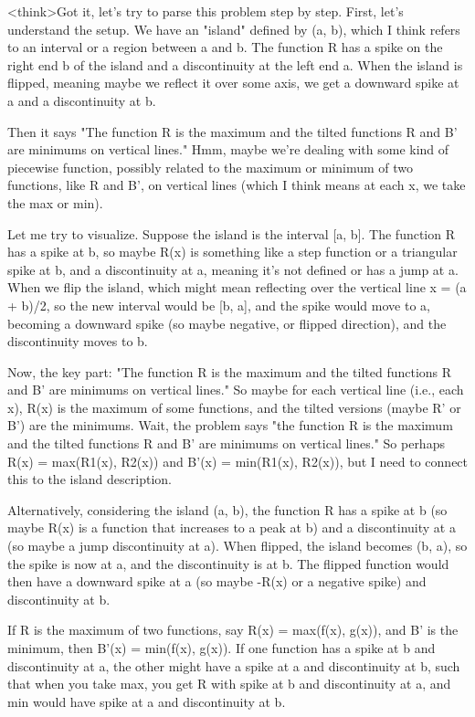 <think>Got it, let's try to parse this problem step by step. First, let's understand the setup. We have an "island" defined by (a, b), which I think refers to an interval or a region between a and b. The function R has a spike on the right end b of the island and a discontinuity at the left end a. When the island is flipped, meaning maybe we reflect it over some axis, we get a downward spike at a and a discontinuity at b. 

Then it says "The function R is the maximum and the tilted functions R and B' are minimums on vertical lines." Hmm, maybe we're dealing with some kind of piecewise function, possibly related to the maximum or minimum of two functions, like R and B', on vertical lines (which I think means at each x, we take the max or min). 

Let me try to visualize. Suppose the island is the interval [a, b]. The function R has a spike at b, so maybe R(x) is something like a step function or a triangular spike at b, and a discontinuity at a, meaning it's not defined or has a jump at a. When we flip the island, which might mean reflecting over the vertical line x = (a + b)/2, so the new interval would be [b, a], and the spike would move to a, becoming a downward spike (so maybe negative, or flipped direction), and the discontinuity moves to b. 

Now, the key part: "The function R is the maximum and the tilted functions R and B' are minimums on vertical lines." So maybe for each vertical line (i.e., each x), R(x) is the maximum of some functions, and the tilted versions (maybe R' or B') are the minimums. Wait, the problem says "the function R is the maximum and the tilted functions R and B' are minimums on vertical lines." So perhaps R(x) = max(R1(x), R2(x)) and B'(x) = min(R1(x), R2(x)), but I need to connect this to the island description.

Alternatively, considering the island (a, b), the function R has a spike at b (so maybe R(x) is a function that increases to a peak at b) and a discontinuity at a (so maybe a jump discontinuity at a). When flipped, the island becomes (b, a), so the spike is now at a, and the discontinuity is at b. The flipped function would then have a downward spike at a (so maybe -R(x) or a negative spike) and discontinuity at b. 

If R is the maximum of two functions, say R(x) = max(f(x), g(x)), and B' is the minimum, then B'(x) = min(f(x), g(x)). If one function has a spike at b and discontinuity at a, the other might have a spike at a and discontinuity at b, such that when you take max, you get R with spike at b and discontinuity at a, and min would have spike at a and discontinuity at b. 

